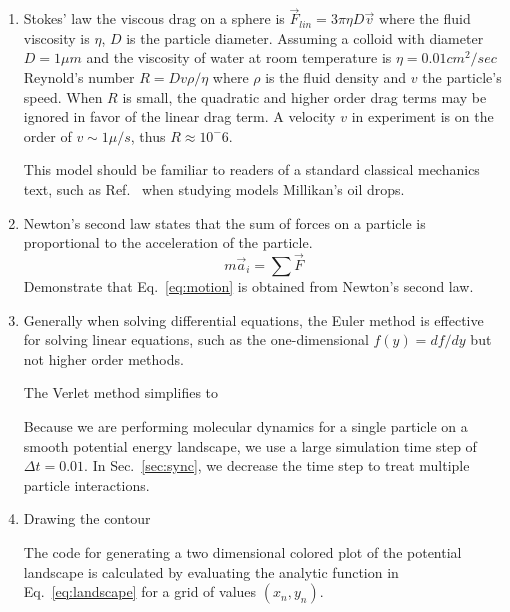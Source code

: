 \documentclass[twocolumn,preprintnumbers,amsmath,amssymb,aps,prx]{revtex4}
\begin{document}
\begin{enumerate}
\item Stokes' law the viscous drag on a sphere is
$\vec{F}_{lin} = 3 \pi \eta D \vec{v}$ \cite{}
where the fluid viscosity is $\eta$,
$D$ is the particle diameter.
Assuming a colloid with diameter 
$D = 1 \mu m$ and
the viscosity of water at room temperature is
$\eta = 0.01 cm^2/sec$ \cite{} %
Reynold's number $R = D v \rho / \eta$
where $\rho$ is the fluid density and $v$ the particle's speed.
When $R$ is small, the quadratic and higher order drag terms
may be ignored in favor of the linear drag term.
A velocity $v$ in experiment is on the order of $v \sim 1 \mu /s$,
thus $R \approx 10^-6$.

This model should be familiar to readers
of a standard classical mechanics text, such as Ref.~\cite{Taylor2005}
when studying 
models Millikan's oil drops.
\label{ex:reynolds}

\item Newton's second law states that the sum of forces on a particle is proportional to the acceleration of the particle.
  \begin{equation}
  m \vec{a}_i = \sum \vec{F}
  \label{eq:n2l}
  \end{equation}
  Demonstrate that Eq.~\ref{eq:motion} is obtained from Newton's second law.
  \label{ex:n2l}

\item
  Generally when solving differential equations,
  the Euler method is effective for solving linear equations,
  such as the one-dimensional 
  $f(y) = df/dy$ 
  but not higher order methods.

  The Verlet method simplifies to

  Because we are performing molecular dynamics
  for a single particle on a smooth potential energy landscape,
  we use a large simulation time step of 
  $\Delta t = 0.01$.
  In Sec.~\ref{sec:sync},
  we decrease the time step
  to treat multiple particle interactions.

  \label{ex:euler}

\item Drawing the contour

  The code for generating
a two dimensional colored plot
of the potential landscape
is calculated by evaluating
the analytic function in Eq.~\ref{eq:landscape}
for a grid of values $(x_n,y_n)$.
  

\end{enumerate}
\end{document}
